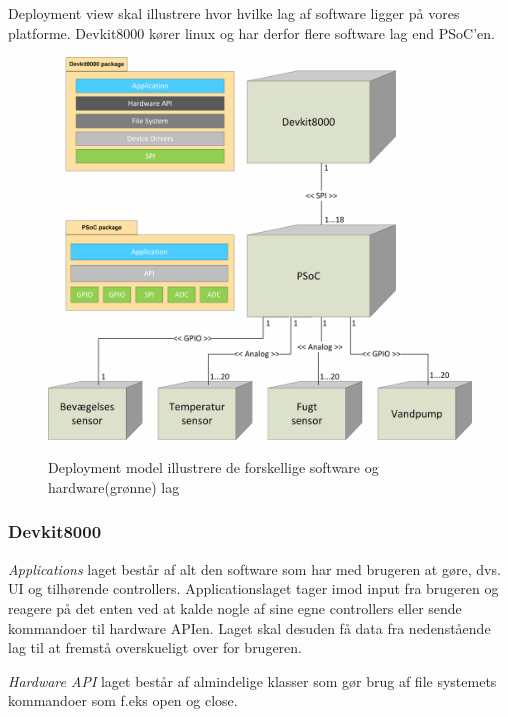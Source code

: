 
Deployment view skal illustrere hvor hvilke lag af software ligger på vores platforme. Devkit8000 kører linux og har derfor flere software lag end PSoC'en.
 
\vspace{15 mm}

\begin{figure}[htbp] \centering
{\includegraphics[scale=0.7]{filer/systemarkitektur/Deployment_model}}
\caption{Deployment model illustrere de forskellige software og hardware(grønne) lag}
\label{fig:Deployment Model}
\end{figure}

\vspace{5 mm}

\subsubsection{Devkit8000}
\textit{Applications} laget består af alt den software som har med brugeren at gøre, dvs. UI og tilhørende controllers. Applicationslaget tager imod input fra brugeren og reagere på det enten ved at kalde nogle af sine egne controllers eller sende kommandoer til hardware APIen. Laget skal desuden få data fra nedenstående lag til at fremstå overskueligt over for brugeren.

\clearpage

\textit{Hardware API} laget består af almindelige klasser som gør brug af file systemets kommandoer som f.eks open og close.

